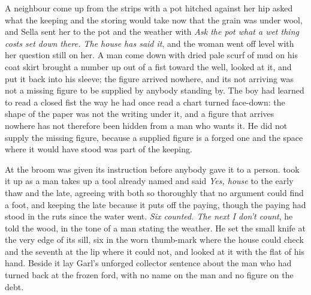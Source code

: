 A neighbour come up from the strips with a pot hitched against her hip asked what the keeping and the storing would take now that the grain was under wool, and Sella sent her to the pot and the weather with \emph{Ask the pot what a wet thing costs set down there. The house has said it}, and the woman went off level with her question still on her. A man come down  with dried pale scurf of mud on his coat skirt brought a number up out of a fist toward the well, looked at it, and put it back into his sleeve; the figure arrived nowhere, and its not arriving was not a missing figure to be supplied by anybody standing by. The boy had learned to read a closed fist the way he had once read a chart turned face-down: the shape of the paper was not the writing under it, and a figure that arrives nowhere has not therefore been hidden from a man who wants it. He did not supply the missing figure, because a supplied figure is a forged one and the space where it would have stood was part of the keeping.

\scenebreak

At  the broom was given its instruction before anybody gave it to a person.  took it up as a man takes up a tool already named and said \emph{Yes, house} to the early thaw and the late, agreeing with both so thoroughly that no argument could find a foot, and keeping the late because it puts off the paying, though the paying had stood in the ruts since the water went. \emph{Six counted. The next I don't count}, he told the wood, in the tone of a man stating the weather. He set the small knife at the very edge of its sill, six in the worn thumb-mark where the house could check and the seventh at the lip where it could not, and looked at it with the flat of his hand. Beside it lay Garl's unforged collector sentence about the man who had turned back at the frozen ford, with no name on the man and no figure on the debt.

